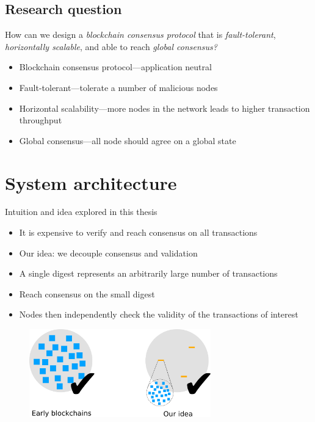 \documentclass{beamer}
\begin{document}
\subsection{Research question}
\begin{frame}{\subsecname}
  \begin{block}{}
    \Large{
    How can we design a \emph{blockchain consensus protocol} that is \emph{fault-tolerant},
    \emph{horizontally scalable}, and able to reach \emph{global consensus?}
    }
  \end{block}
  \begin{itemize}
    \item Blockchain consensus protocol---application neutral
    \item Fault-tolerant---tolerate a number of malicious nodes
    \item Horizontal scalability---more nodes in the network leads to higher transaction throughput
    \item Global consensus---all node should agree on a global state
  \end{itemize}
\end{frame}

\section{System architecture}
\begin{frame}{Intuition and idea explored in this thesis}
  \begin{itemize}
    \item It is expensive to verify and reach consensus on all transactions
    \item Our idea: we decouple consensus and validation
    \item A single digest represents an arbitrarily large number of transactions
    \item Reach consensus on the small digest
    \item Nodes then independently check the validity of the transactions of interest
  \end{itemize}
  \begin{figure}[h]
  \includegraphics[width=0.7\textwidth]{idea}
  \centering
  \end{figure}
\end{frame}
\end{document}
